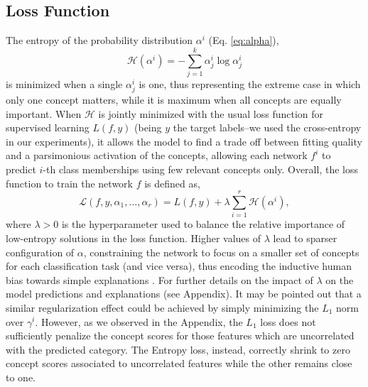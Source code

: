 \subsection{Loss Function}
The entropy of the probability distribution $\alpha^i$ (Eq. \ref{eq:alpha}),
\begin{equation}
    \mathcal{H}(\alpha^i) = - \sum_{j=1}^k \alpha^i_j \log \alpha^i_j
    \label{eq:ent}
\end{equation}
is minimized when a single $\alpha^i_j$ is one, thus representing the extreme case in which only one concept matters, while it is maximum when all concepts are equally important. When $\mathcal{H}$ is jointly minimized with the usual loss function for supervised learning $L(f,y)$ (being $y$ the target labels--we used the cross-entropy in our experiments), it allows the model to find a trade off between fitting quality and a parsimonious activation of the concepts, 
allowing each network $f^i$ to predict $i$-th class memberships using few relevant concepts only.
Overall, the loss function to train the network $f$ is defined as,
\begin{equation}
    \mathcal{L}(f,y,\alpha_1,\ldots,\alpha_r) = L(f,y) + \lambda \sum_{i=1}^r\mathcal{H}(\alpha^i),
    \label{eq:loss}
\end{equation}
where $\lambda > 0$ is the hyperparameter used to balance the relative importance of low-entropy solutions in the loss function. Higher values of $\lambda$ lead to sparser configuration of $\alpha$, constraining the network to focus on a smaller set of concepts for each classification task (and vice versa), thus encoding the inductive human bias towards simple explanations \citep{miller1956magical,cowan2001magical,ma2014changing}. For further details on the impact of $\lambda$ on the model predictions and explanations (see Appendix).
It may be pointed out that a similar regularization effect could be achieved by simply minimizing the $L_1$ norm over $\gamma^i$. However, as we observed in the Appendix, the $L_1$ loss does not sufficiently penalize the concept scores for those features which are uncorrelated with the predicted category. The Entropy loss, instead, correctly shrink to zero concept scores associated to uncorrelated features while the other remains close to one.

